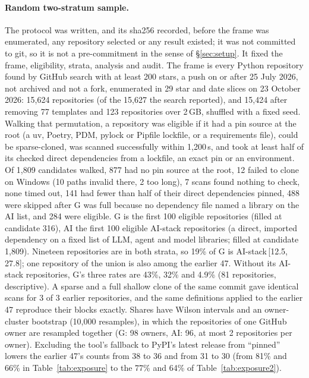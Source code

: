 \documentclass[11pt]{article}
\newcommand{\ci}[2]{\,[#1,\,#2]}
\begin{document}
\paragraph{Random two-stratum sample.}
The protocol was written, and its sha256 recorded, before the frame was enumerated, any repository selected or any result existed; it was not committed to git, so it is not a pre-commitment in the sense of \S\ref{sec:setup}. It fixed the frame, eligibility, strata, analysis and audit.
The frame is every Python repository found by GitHub search with at least 200 stars, a push on or after 25 July 2026, not archived and not a fork, enumerated in 29 star and date slices on 23 October 2026: 15,624 repositories (of the 15,627 the search reported), and 15,424 after removing 77 templates and 123 repositories over 2\,GB, shuffled with a fixed seed.
Walking that permutation, a repository was eligible if it had a pin source at the root (a uv, Poetry, PDM, pylock or Pipfile lockfile, or a requirements file), could be sparse-cloned, was scanned successfully within 1,200\,s, and took at least half of its checked direct dependencies from a lockfile, an exact pin or an environment.
Of 1,809 candidates walked, 877 had no pin source at the root, 12 failed to clone on Windows (10 paths invalid there, 2 too long), 7 scans found nothing to check, none timed out, 141 had fewer than half of their direct dependencies pinned, 488 were skipped after G was full because no dependency file named a library on the AI list, and 284 were eligible.
G is the first 100 eligible repositories (filled at candidate 316), AI the first 100 eligible AI-stack repositories (a direct, imported dependency on a fixed list of LLM, agent and model libraries; filled at candidate 1,809). Nineteen repositories are in both strata, so 19\% of G is AI-stack\ci{12.5}{27.8}; one repository of the union is also among the earlier 47.
Without its AI-stack repositories, G's three rates are 43\%, 32\% and 4.9\% (81 repositories, descriptive).
A sparse and a full shallow clone of the same commit gave identical scans for 3 of 3 earlier repositories, and the same definitions applied to the earlier 47 reproduce their blocks exactly.
Shares have Wilson intervals and an owner-cluster bootstrap (10,000 resamples), in which the repositories of one GitHub owner are resampled together (G: 98 owners, AI: 96, at most 2 repositories per owner).
Excluding the tool's fallback to PyPI's latest release from ``pinned'' lowers the earlier 47's counts from 38 to 36 and from 31 to 30 (from 81\% and 66\% in Table~\ref{tab:exposure} to the 77\% and 64\% of Table~\ref{tab:exposure2}).
\end{document}

